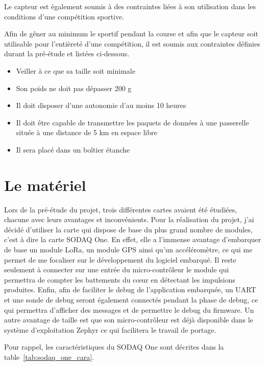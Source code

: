 Le capteur est également soumis à des contraintes liées à son utilisation dans les conditions d'une compétition sportive.

Afin de gêner au minimum le sportif pendant la course et afin que le capteur soit utilisable pour l'entièreté d'une compétition, il est soumis aux contraintes définies durant la pré-étude et listées ci-dessous.

\begin{itemize}
\item Veiller à ce que sa taille soit minimale
\item Son poids ne doit pas dépasser 200 g
\item Il doit disposer d'une autonomie d'au moins 10 heures
\item Il doit être capable de transmettre les paquets de données à une passerelle située à une distance de 5 km en espace libre
\item Il sera placé dans un boîtier étanche
\end{itemize}

\section{Le matériel}

Lors de la pré-étude du projet, trois différentes cartes avaient été étudiées, chacune avec leurs avantages et inconvénients. Pour la réalisation du projet, j'ai décidé d'utiliser la carte qui dispose de base du plus grand nombre de modules, c'est à dire la carte SODAQ One. En effet, elle a l'immense avantage d'embarquer de base un module LoRa, un module GPS ainsi qu'un accéléromètre, ce qui me permet de me focaliser sur le développement du logiciel embarqué. Il reste seulement à connecter sur une entrée du micro-contrôleur le module qui permettra de compter les battements du cœur en détectant les impulsions produites. Enfin, afin de faciliter le debug de l'application embarquée, un UART et une sonde de debug seront également connectés pendant la phase de debug, ce qui permettra d'afficher des messages et de permettre le debug du firmware. Un autre avantage de taille est que son micro-contrôleur est déjà disponible dans le système d'exploitation Zephyr ce qui facilitera le travail de portage.

Pour rappel, les caractéristiques du SODAQ One sont décrites dans la table~\ref{tab:sodaq_one_cara}.

